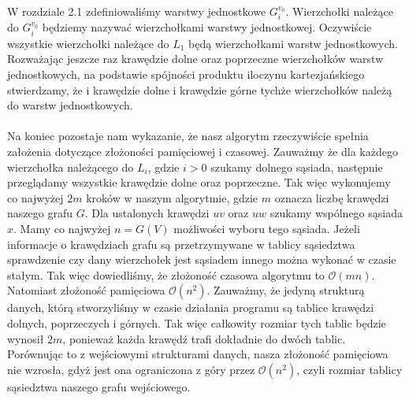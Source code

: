 \documentclass[12pt,a4paper,titlepage]{article}
\begin{document}
W rozdziale 2.1 zdefiniowaliśmy warstwy jednostkowe $G_i ^{v_0}$. Wierzchołki należące do $G_i ^{v_0}$ będziemy nazywać wierzchołkami warstwy jednostkowej. Oczywiście wszystkie wierzchołki należące do $L_1$ będą wierzchołkami warstw jednostkowych.\\
Rozważając jeszcze raz krawędzie dolne oraz poprzeczne wierzchołków warstw jednostkowych, na podstawie spójności produktu iloczynu kartezjańskiego stwierdzamy, że i krawędzie dolne i krawędzie górne tychże wierzchołków należą do warstw jednostkowych.\\
\\
Na koniec pozostaje nam wykazanie, że nasz algorytm rzeczywiście spełnia założenia dotyczące złożoności pamięciowej i czasowej. Zauważmy że dla każdego wierzchołka należącego do $L_i$, gdzie $i>0$ szukamy dolnego sąsiada, następnie przeglądamy wszystkie krawędzie dolne oraz poprzeczne. Tak więc wykonujemy co najwyżej $2m$ kroków w naszym algorytmie, gdzie $m$ oznacza liczbę krawędzi naszego grafu $G$. Dla ustalonych krawędzi $uv$ oraz $uw$ szukamy wspólnego sąsiada $x$. Mamy co najwyżej $n=G(V)$ możliwości wyboru tego sąsiada. Jeżeli informacje o krawędziach grafu są przetrzymywane w tablicy sąsiedztwa sprawdzenie czy dany wierzchołek jest sąsiadem innego można wykonać w czasie stałym. Tak więc dowiedliśmy, że złożoność czasowa algorytmu to $\mathcal{O}(mn)$. Natomiast złożoność pamięciowa $\mathcal{O}(n^2)$. Zauważmy, że jedyną strukturą danych, którą stworzyliśmy w czasie działania programu są tablice krawędzi dolnych, poprzeczych i górnych. Tak więc całkowity rozmiar tych tablic będzie wynosił $2m$, ponieważ każda krawędź trafi dokładnie do dwóch tablic. Porównując to z wejściowymi strukturami danych, nasza złożoność pamięciowa nie wzrosła, gdyż jest ona ograniczona z góry przez $\mathcal{O}(n^2)$, czyli rozmiar tablicy sąsiedztwa naszego grafu wejściowego. \\
\end{document}
